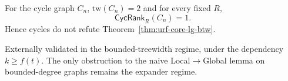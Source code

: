 \begin{remark}
For the cycle graph $C_n$, $\mathrm{tw}(C_n)=2$ and for every fixed $R$,
\[
\mathsf{CycRank}_R(C_n)=1.
\]
Hence cycles do not refute Theorem~\ref{thm:urf-core-lg-btw}.
\end{remark}

\begin{remark}[Status]
Externally validated in the bounded-treewidth regime, under the dependency $k\ge f(t)$.
The only obstruction to the naive Local$\to$Global lemma on bounded-degree graphs remains the expander regime.
\end{remark}



